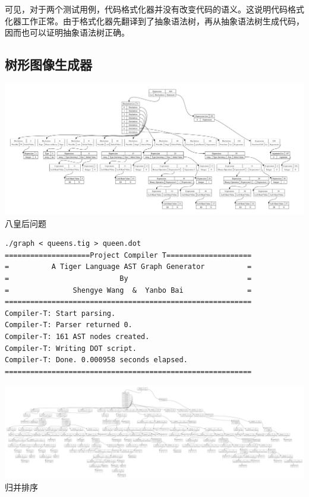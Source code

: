 可见，对于两个测试用例，代码格式化器并没有改变代码的语义。这说明代码格式化器工作正常。由于格式化器先翻译到了抽象语法树，再从抽象语法树生成代码，因而也可以证明抽象语法树正确。

\subsection{树形图像生成器}

\begin{center}
\includegraphics[width=\columnwidth]{queen}  \\
八皇后问题
\end{center}

\begin{verbatim}
./graph < queens.tig > queen.dot
====================Project Compiler T====================
=          A Tiger Language AST Graph Generator          =
=                          By                            =
=               Shengye Wang  &  Yanbo Bai               =
==========================================================
Compiler-T: Start parsing.
Compiler-T: Parser returned 0.
Compiler-T: 161 AST nodes created.
Compiler-T: Writing DOT script.
Compiler-T: Done. 0.000958 seconds elapsed.
==========================================================
\end{verbatim}

\begin{center}
\includegraphics[width=\columnwidth]{merge}  \\
归并排序
\end{center}


